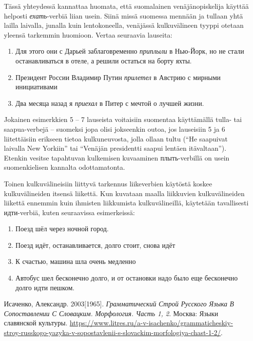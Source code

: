 \documentclass[]{scrartcl}
\providecommand{\tightlist}{%
  \setlength{\itemsep}{0pt}\setlength{\parskip}{0pt}}
\begin{document}
Tässä yhteydessä kannattaa huomata, että suomalainen venäjänopiskelija
käyttää helposti \emph{ехать}-verbiä liian usein. Siinä missä suomessa
mennään ja tullaan yhtä lailla laivalla, junalla kuin lentokoneella,
venäjässä kulkuvälineen tyyppi otetaan yleensä tarkemmin huomioon.
Vertaa seuraavia lauseita:

\begin{enumerate}
\def\labelenumi{(\arabic{enumi})}
\setcounter{enumi}{4}
\tightlist
\item
  Для этого они с Дарьей заблаговременно \emph{приплыли} в Нью-Йорк, но
  не стали останавливаться в отеле, а решили остаться на борту яхты.
\item
  Президент России Владимир Путин \emph{прилетел} в Австрию с мирными
  инициативами
\item
  Два месяца назад я \emph{приехал} в Питер с мечтой о лучшей жизни.
\end{enumerate}

Jokainen esimerkkien 5 -- 7 lauseista voitaisiin suomentaa käyttämällä
tulla- tai saapua-verbejä -- suomeksi jopa olisi jokseenkin outoa, jos
lauseisiin 5 ja 6 liitettäisiin erikseen tietoa kulkuneuvosta, jolla
ollaan tultu (``He saapuivat laivalla New Yorkiin'' tai ``Venäjän
presidentti saapui lentäen itävaltaan''). Etenkin vesitse tapahtuvan
kulkemisen kuvaaminen плыть-verbillä on usein suomenkielisen kannalta
odottamatonta.

Toinen kulkuvälineisiin liittyvä tarkennus liikeverbien käytöstä koskee
kulkuvälineiden itsensä liikettä. Kun kuvataan maalla liikkuvien
kulkuvälineiden liikettä ennemmin kuin ihmisten liikkumista
kulkuvälineillä, käytetään tavallisesti идти-verbiä, kuten seuraavissa
esimerkeissä:

\begin{enumerate}
\def\labelenumi{(\arabic{enumi})}
\setcounter{enumi}{7}
\tightlist
\item
  Поезд шёл через ночной город.
\item
  Поезд идёт, останавливается, долго стоит, снова идёт
\item
  К счастью, машина шла очень медленно
\item
  Автобус шел бесконечно долго, и от остановки надо было еще бесконечно
  долго идти пешком.
\end{enumerate}

Исаченко, Александр. 2003{[}1965{]}. \emph{Грамматический Строй Русского
Языка В Сопоставлении С Словацким. Морфология. Часть 1, 2}. Москва:
Языки славянской культуры.
\url{https://www.litres.ru/a-v-isachenko/grammaticheskiy-stroy-russkogo-yazyka-v-sopostavlenii-s-slovackim-morfologiya-chast-1-2/}.
\end{document}
